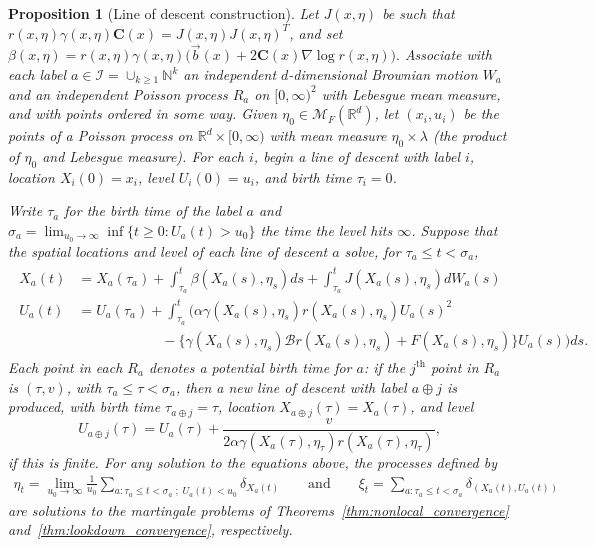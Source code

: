 \documentclass[12pt]{article}
\newtheorem{proposition}[theorem]{Proposition}
\newcommand{\IR}{\mathbb R}
\newcommand{\IN}{\mathbb N}
\newcommand{\grad}{\nabla}
\newcommand{\DG}{\mathcal{B}}  %
\newcommand{\meanq}{\vec b}    %
\newcommand{\covq}{\mathbf{C}}     %
\newcommand{\lp}{\xi}              %
\newcommand{\labelspace}{\mathcal{I}} %
\newcommand{\concat}{\oplus}   %
\newcommand{\measures}{\mathcal{M}_F(\IR^d)} %
\numberwithin{equation}{section}
\begin{document}
\begin{proposition}[Line of descent construction]
    \label{prop:limiting_construction}
Let 
$J(x,\eta)$ be such that $r(x,\eta)\gamma(x,\eta)\covq(x) = J(x,\eta) J(x,\eta)^T$, and set
$\beta(x, \eta) = r(x,\eta)\gamma(x,\eta)\big(\meanq(x) + 2 \covq(x) \grad \log r(x, \eta)\big).$
Associate with each label $a \in \labelspace = \cup_{k\geq 1}\IN^k$
an independent $d$-dimensional Brownian motion $W_a$
and an independent Poisson process $R_a$ on $[0, \infty)^2$
with Lebesgue mean measure,
and with points ordered in some way.
Given $\eta_0 \in \measures$,
let $(x_i, u_i)$ be the points of a Poisson process
on $\IR^d \times [0, \infty)$ 
with mean measure $\eta_0\times \lambda$
(the product of $\eta_0$ and Lebesgue measure).
For each $i$, begin a line of descent
with label $i$, location $X_i(0) = x_i$, 
level $U_i(0) = u_i$, and birth time $\tau_i = 0$.

Write $\tau_a$ for the birth time of the label $a$ and 
$\sigma_a = \lim_{u_0 \to \infty} \inf\{t \ge 0: U_a(t) > u_0\}$
the time the level hits $\infty$.
Suppose that the spatial locations and level of each line of descent $a$
solve, for $\tau_a \le t < \sigma_a$,
\begin{align}
    \label{eqn:limiting_construction}
    \begin{split}
X_a(t)
    &=
    X_a(\tau_a)
    + \int_{\tau_a}^{t}
        \beta(X_a(s), \eta_s) ds
    + \int_{\tau_a}^{t}
        J(X_a(s),\eta_s) dW_a(s)
    \\
U_a(t)
    &=
    U_a(\tau_a)
    + \int_{\tau_a}^{t}
    \bigg(
        \alpha \gamma(X_a(s),\eta_s)
        r(X_a(s), \eta_s) U_a(s)^2
\\ &\qquad \qquad \qquad {}   
        -
        \big\{
            \gamma(X_a(s),\eta_s) \DG r(X_a(s),\eta_s)
            + F(X_a(s), \eta_s)
        \big\}
        U_a(s)
    \bigg)
    ds .
    \end{split}
\end{align}
Each point in each $R_a$ denotes a potential birth time for $a$:
if the $j^\text{th}$ point in $R_a$ is $(\tau, v)$, with 
$\tau_a \le \tau < \sigma_a$,
then a new line of descent with label $a \concat j$ is produced,
with birth time $\tau_{a \concat j} = \tau$,
    location $X_{a \concat j}(\tau) = X_a(\tau)$, and level
$$
    U_{a \concat j}(\tau) = U_a(\tau)
    + \frac{v}{ 2 \alpha \gamma(X_a(\tau), \eta_\tau) r(X_a(\tau), \eta_\tau) } ,
$$
if this is finite.
For any solution to the equations above, the processes defined by
\begin{align*}
    \eta_t
    =
    \lim_{u_0 \to \infty} \frac{1}{u_0}
        \sum_{a : \tau_a \le t < \sigma_a \; ; \; U_a(t) < u_0} \delta_{X_a(t)}
    \qquad \text{and} \qquad
    \lp_t = \sum_{a : \tau_a \le t < \sigma_a} \delta_{(X_a(t), U_a(t))} 
\end{align*}
are solutions to the martingale problems of
Theorems~\ref{thm:nonlocal_convergence} and~\ref{thm:lookdown_convergence},
respectively.
\end{proposition}
\end{document}
